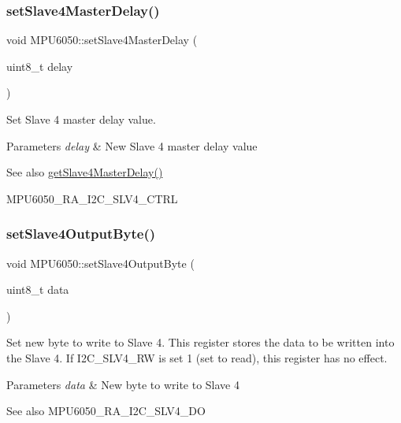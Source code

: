 \subsubsection{\texorpdfstring{setSlave4MasterDelay()}{setSlave4MasterDelay()}}
{\footnotesize\ttfamily void M\+P\+U6050\+::set\+Slave4\+Master\+Delay (\begin{DoxyParamCaption}\item[{uint8\+\_\+t}]{delay }\end{DoxyParamCaption})}

Set Slave 4 master delay value. 
\begin{DoxyParams}{Parameters}
{\em delay} & New Slave 4 master delay value \\
\hline
\end{DoxyParams}
\begin{DoxySeeAlso}{See also}
\mbox{\hyperlink{class_m_p_u6050_a9a4585b3c9e61478db198011107a56a9}{get\+Slave4\+Master\+Delay()}} 

M\+P\+U6050\+\_\+\+R\+A\+\_\+\+I2\+C\+\_\+\+S\+L\+V4\+\_\+\+C\+T\+RL 
\end{DoxySeeAlso}
\mbox{\label{class_m_p_u6050_a17147a6f477be79f58889e9e6329392f}} 
\subsubsection{\texorpdfstring{setSlave4OutputByte()}{setSlave4OutputByte()}}
{\footnotesize\ttfamily void M\+P\+U6050\+::set\+Slave4\+Output\+Byte (\begin{DoxyParamCaption}\item[{uint8\+\_\+t}]{data }\end{DoxyParamCaption})}

Set new byte to write to Slave 4. This register stores the data to be written into the Slave 4. If I2\+C\+\_\+\+S\+L\+V4\+\_\+\+RW is set 1 (set to read), this register has no effect. 
\begin{DoxyParams}{Parameters}
{\em data} & New byte to write to Slave 4 \\
\hline
\end{DoxyParams}
\begin{DoxySeeAlso}{See also}
M\+P\+U6050\+\_\+\+R\+A\+\_\+\+I2\+C\+\_\+\+S\+L\+V4\+\_\+\+DO 
\end{DoxySeeAlso}
\mbox{\label{class_m_p_u6050_ae54dc358da048e61a1ac68012300fdaa}} 
